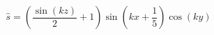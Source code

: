 $$
\hat s = \left(\frac{\sin{\left(k z \right)}}{2} + 1\right) \sin{\left(k x + \frac{1}{5} \right)} \cos{\left(k y \right)}
$$
